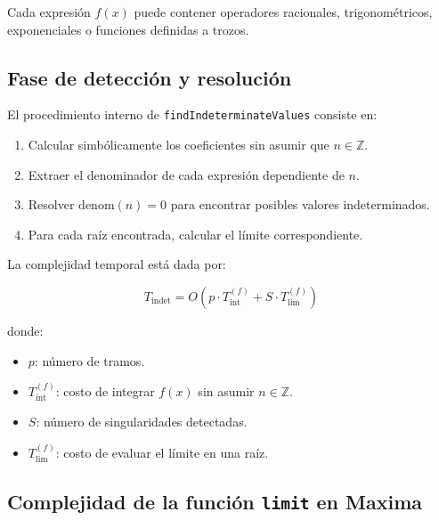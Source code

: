 Cada expresión \( f(x) \) puede contener operadores racionales,
trigonométricos, exponenciales o funciones definidas a trozos.

\subsection{Fase de detección y resolución}

El procedimiento interno de \texttt{findIndeterminateValues} consiste en:

\begin{enumerate}
	\item Calcular simbólicamente los coeficientes sin asumir que \( n \in \mathbb{Z} \).
	\item Extraer el denominador de cada expresión dependiente de \( n \).
	\item Resolver \( \text{denom}(n) = 0 \) para encontrar posibles valores
	indeterminados.
	\item Para cada raíz encontrada, calcular el límite correspondiente.
\end{enumerate}

La complejidad temporal está dada por:

\[
T_{\text{indet}} = O\left(p \cdot T_{\text{int}}^{(f)} + S \cdot T_{\text{lim}}^{(f)}\right)
\]

donde:
\begin{itemize}
	\item \( p \): número de tramos.
	\item \( T_{\text{int}}^{(f)} \): costo de integrar \( f(x) \) sin asumir \( n \in \mathbb{Z} \).
	\item \( S \): número de singularidades detectadas.
	\item \( T_{\text{lim}}^{(f)} \): costo de evaluar el límite en una raíz.
\end{itemize}

\subsection{Complejidad de la función \texttt{limit} en Maxima}

